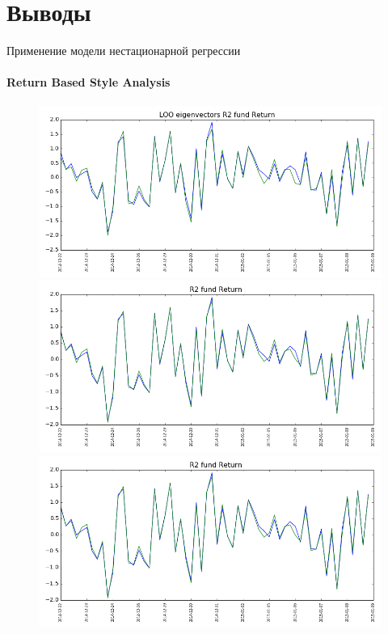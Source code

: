 \documentclass[11pt]{beamer}
\begin{document}
\section{Выводы}
\begin{frame}{Применение модели нестационарной регрессии}
\framesubtitle{Return Based Style Analysis}
\begin{figure}
\centering
\includegraphics[scale=0.22]{looeig_return.png}
\centering
\includegraphics[scale=0.22]{lho_return.png}\\
\centering
\includegraphics[scale=0.22]{aic_return.png}
\end{figure}
\end{frame}
\end{document}
